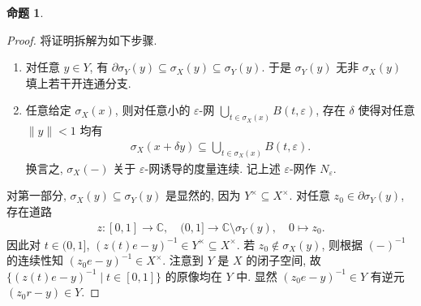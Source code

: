 \documentclass{MainStyle}
\theoremstyle{definition}
\theoremstyle{definition}
\theoremstyle{definition}
\theoremstyle{definition}
\newtheorem{proposition}{命题}
\theoremstyle{definition}
\theoremstyle{definition}
\theoremstyle{definition}
\theoremstyle{remark}
\theoremstyle{remark}
\begin{document}
\begin{proposition}
\begin{center}
    \end{center}
    \begin{proof}
        将证明拆解为如下步骤.
        \begin{enumerate}
            \item 对任意 $y\in Y$, 有 $\partial \sigma_Y(y)\subseteq \sigma_X(y)\subseteq \sigma_Y(y)$. 于是 $\sigma_Y(y)$ 无非 $\sigma_X(y)$ 填上若干开连通分支.
            \item 任意给定 $\sigma_X(x)$, 则对任意小的 $\varepsilon$-网 $\bigcup_{t\in \sigma_X(x)}B(t,\varepsilon)$, 存在 $\delta$ 使得对任意 $\|y\|< 1$ 均有
                  \begin{align*}
                      \sigma_X(x+\delta y)\subseteq \bigcup_{t\in \sigma_X(x)}B(t,\varepsilon).
                  \end{align*}
                  换言之, $\sigma_X(-)$ 关于 $\varepsilon$-网诱导的度量连续. 记上述 $\varepsilon$-网作 $N_\varepsilon$.
        \end{enumerate}
        对第一部分, $\sigma_X(y)\subseteq \sigma_Y(y)$ 是显然的, 因为 $Y^\times \subseteq X^\times$. 对任意 $z_0\in \partial\sigma_Y(y)$, 存在道路
        \begin{align*}
            z:[0,1]\to \mathbb C, \quad (0,1]\to \mathbb C\setminus \sigma_Y(y),\quad 0\mapsto z_0.
        \end{align*}
        因此对 $t\in (0,1]$, $(z(t)e-y)^{-1}\in Y^\times \subseteq X^\times$. 若 $z_0\notin \sigma_X(y)$, 则根据 $(-)^{-1}$ 的连续性知 $(z_0e-y)^{-1}\in X^\times$. 注意到 $Y$ 是 $X$ 的闭子空间, 故 $\{(z(t)e-y)^{-1}\mid t\in [0,1]\}$ 的原像均在 $Y$ 中. 显然 $(z_0e-y)^{-1}\in Y$ 有逆元 $(z_0r-y)\in Y$. \par

\end{proof}
\end{proposition}
\end{document}

